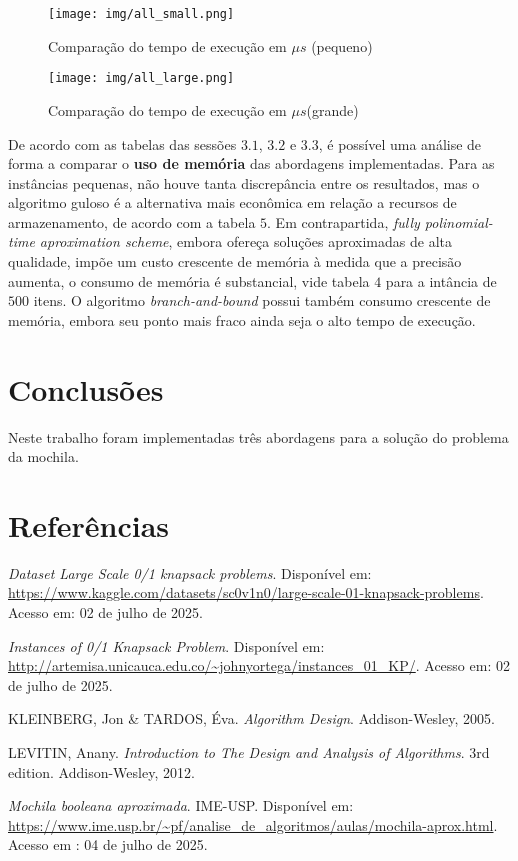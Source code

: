 \documentclass[12pt]{article}
\begin{document}
\begin{figure}[H]
    \centering
    \begin{minipage}[b]{0.48\linewidth}
        \centering
        \texttt{[image: img/all\_small.png]}
        \caption{Comparação do tempo de execução em \(\mu s\) (pequeno)}
        \label{fig:fptas_small}
    \end{minipage}
    \hfill
    \begin{minipage}[b]{0.48\linewidth}
        \centering
        \texttt{[image: img/all\_large.png]}
        \caption{Comparação do tempo de execução em \(\mu s\)(grande)}
        \label{fig:fptas_large}
    \end{minipage}
\end{figure}

De acordo com as tabelas das sessões \(3.1\), \(3.2\) e \(3.3\), é possível uma análise de forma a comparar o \textbf{uso de memória} das abordagens implementadas. Para as instâncias pequenas, não houve tanta discrepância entre os resultados, mas o algoritmo guloso é a alternativa mais econômica em relação a recursos de armazenamento, de acordo com a tabela \(5\). Em contrapartida, \textit{fully polinomial-time aproximation scheme}, embora ofereça soluções aproximadas de alta qualidade, impõe um custo crescente de memória à medida que a precisão aumenta, o consumo de memória é substancial, vide tabela \(4\) para a intância de \(500\) itens. O algoritmo \textit{branch-and-bound} possui também consumo crescente de memória, embora seu ponto mais fraco ainda seja o alto tempo de execução.

\section{Conclusões}

Neste trabalho foram implementadas três abordagens para a solução do problema da mochila.

\section{Referências}

\begin{thebibliography}{1}

\textit{Dataset Large Scale 0/1 knapsack problems}. Disponível em: \url{https://www.kaggle.com/datasets/sc0v1n0/large-scale-01-knapsack-problems}. Acesso em: 02 de julho de 2025.

\textit{Instances of 0/1 Knapsack Problem}. Disponível em: \url{http://artemisa.unicauca.edu.co/~johnyortega/instances_01_KP/}. Acesso em: 02 de julho de 2025.

 KLEINBERG, Jon \& TARDOS, Éva. \textit{Algorithm Design}. Addison-Wesley, 2005.

LEVITIN, Anany. \textit{Introduction to The Design and Analysis of Algorithms}. 3rd edition. Addison-Wesley, 2012.

 \textit{Mochila booleana aproximada}. IME-USP. Disponível em: \url{https://www.ime.usp.br/~pf/analise_de_algoritmos/aulas/mochila-aprox.html}. Acesso em : 04 de julho de 2025.

\end{thebibliography}
\end{document}

